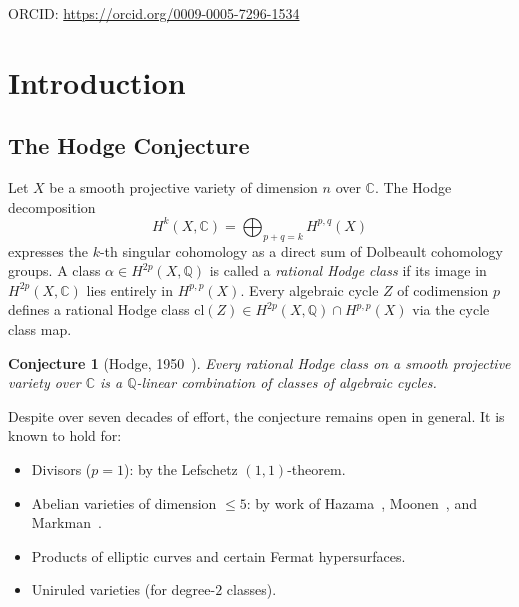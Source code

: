\documentclass[aps,prd,twocolumn,superscriptaddress,nofootinbib]{revtex4-2}
\newtheorem{conjecture}[theorem]{Conjecture}
\theoremstyle{definition}
\theoremstyle{remark}
\def\\{ }%
\begin{document}

\maketitle

\begin{center}
\footnotesize
ORCID: \url{https://orcid.org/0009-0005-7296-1534}\\
\end{center}

\clearpage
\tableofcontents
\clearpage

\section{Introduction}
\label{sec:intro}

\subsection{The Hodge Conjecture}

Let $X$ be a smooth projective variety of dimension $n$ over $\mathbb{C}$. The Hodge decomposition
\begin{equation}
H^k(X, \mathbb{C}) = \bigoplus_{p+q=k} H^{p,q}(X)
\label{eq:hodge_decomp}
\end{equation}
expresses the $k$-th singular cohomology as a direct sum of Dolbeault cohomology groups. A class $\alpha \in H^{2p}(X, \mathbb{Q})$ is called a \textit{rational Hodge class} if its image in $H^{2p}(X, \mathbb{C})$ lies entirely in $H^{p,p}(X)$. Every algebraic cycle $Z$ of codimension $p$ defines a rational Hodge class $\mathrm{cl}(Z) \in H^{2p}(X, \mathbb{Q}) \cap H^{p,p}(X)$ via the cycle class map.

\begin{conjecture}[Hodge, 1950~\cite{Hodge1950}]
\label{conj:hodge}
Every rational Hodge class on a smooth projective variety over $\mathbb{C}$ is a $\mathbb{Q}$-linear combination of classes of algebraic cycles.
\end{conjecture}

Despite over seven decades of effort, the conjecture remains open in general. It is known to hold for:
\begin{itemize}
\item Divisors ($p = 1$): by the Lefschetz $(1,1)$-theorem.
\item Abelian varieties of dimension $\leq 5$: by work of Hazama~\cite{Hazama1994}, Moonen~\cite{Moonen1999}, and Markman~\cite{Markman2025}.
\item Products of elliptic curves and certain Fermat hypersurfaces.
\item Uniruled varieties (for degree-$2$ classes).
\end{itemize}
\end{document}
